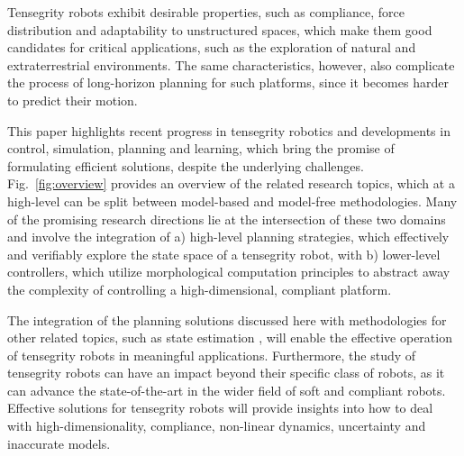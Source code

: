 Tensegrity robots exhibit desirable properties, such as compliance,
force distribution and adaptability to unstructured spaces, which make
them good candidates for critical applications, such as the
exploration of natural and extraterrestrial environments. The same
characteristics, however, also complicate the process of long-horizon
planning for such platforms, since it becomes harder to predict their
motion.

This paper highlights recent progress in tensegrity robotics and
developments in control, simulation, planning and learning, which
bring the promise of formulating efficient solutions, despite the
underlying challenges.  Fig.~\ref{fig:overview} provides an overview
of the related research topics, which at a high-level can be split
between model-based and model-free methodologies. Many of the
promising research directions lie at the intersection of these two
domains and involve the integration of a) high-level planning
strategies, which effectively and verifiably explore the state space
of a tensegrity robot, with b) lower-level controllers, which utilize
morphological computation principles to abstract away the complexity
of controlling a high-dimensional, compliant platform.

The integration of the planning solutions discussed here with
methodologies for other related topics, such as state
estimation \cite{Caluwaerts:2015aa}, will enable the effective
operation of tensegrity robots in meaningful applications.
Furthermore, the study of tensegrity robots can have an impact beyond
their specific class of robots, as it can advance the state-of-the-art
in the wider field of soft and compliant robots. Effective solutions
for tensegrity robots will provide insights into how to deal with
high-dimensionality, compliance, non-linear dynamics, uncertainty and
inaccurate models.


 

